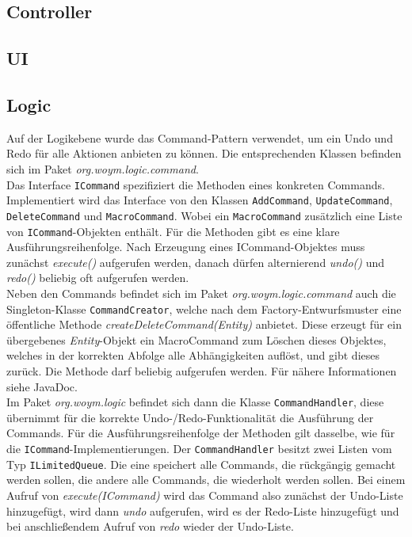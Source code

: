 \documentclass[fontsize=12pt,paper=a4,twoside]{scrartcl}
\begin{document}



\subsection{Controller}
\label{subsec:Controller}

\subsection{UI}
\label{subsec:UI}

\subsection{Logic}
\label{subsec:logic}
Auf der Logikebene wurde das Command-Pattern verwendet, um ein Undo und Redo für alle Aktionen anbieten zu können. Die entsprechenden Klassen befinden sich im Paket \textit{org.woym.logic.command}. \\
Das Interface \texttt{ICommand} spezifiziert die Methoden eines konkreten Commands. Implementiert wird das Interface von den Klassen \texttt{AddCommand}, \texttt{UpdateCommand}, \texttt{DeleteCommand} und \texttt{MacroCommand}. Wobei ein \texttt{MacroCommand} zusätzlich eine Liste von \texttt{ICommand}-Objekten enthält. Für die Methoden gibt es eine klare Ausführungsreihenfolge. Nach Erzeugung eines ICommand-Objektes muss zunächst \textit{execute()} aufgerufen werden, danach dürfen alternierend \textit{undo()} und \textit{redo()} beliebig oft aufgerufen werden. \\
Neben den Commands befindet sich im Paket \textit{org.woym.logic.command} auch die Singleton-Klasse \texttt{CommandCreator}, welche nach dem Factory-Entwurfsmuster eine öffentliche Methode \textit{createDeleteCommand(Entity)} anbietet. Diese erzeugt für ein übergebenes \textit{Entity}-Objekt ein MacroCommand zum Löschen dieses Objektes, welches in der korrekten Abfolge alle Abhängigkeiten auflöst, und gibt dieses zurück. Die Methode darf beliebig aufgerufen werden. Für nähere Informationen siehe JavaDoc.\\
Im Paket \textit{org.woym.logic} befindet sich dann die Klasse \texttt{CommandHandler}, diese übernimmt für die korrekte Undo-/Redo-Funktionalität die Ausführung der Commands. Für die Ausführungsreihenfolge der Methoden gilt dasselbe, wie für die \texttt{ICommand}-Implementierungen. Der \texttt{CommandHandler} besitzt zwei Listen vom Typ \texttt{ILimitedQueue}. Die eine speichert alle Commands, die rückgängig gemacht werden sollen, die andere alle Commands, die wiederholt werden sollen. Bei einem Aufruf von \textit{execute(ICommand)} wird das Command also zunächst der Undo-Liste hinzugefügt, wird dann \textit{undo} aufgerufen, wird es der Redo-Liste hinzugefügt und bei anschließendem Aufruf von \textit{redo} wieder der Undo-Liste.\\
\end{document}

